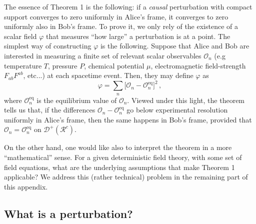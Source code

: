 \documentclass[a4paper, amsfonts, amssymb, amsmath, reprint, showkeys,  twoside, onecolumn,notitlepage,nofootinbib]{revtex4-1}
\theoremstyle{definition}
\theoremstyle{theorem}
\begin{document}
The essence of Theorem 1 is the following: if a \textit{causal} perturbation with compact support converges to zero uniformly in Alice's frame, it converges to zero uniformly also in Bob's frame. To prove it, we only rely of the existence of a scalar field $\varphi$ that measures ``how large'' a perturbation is at a point. The simplest way of constructing $\varphi$ is the following. 
Suppose that Alice and Bob are interested in measuring a finite set of relevant scalar observables $\mathcal{O}_n$ (e.g temperature $T$, pressure $P$, chemical potential $\mu$, electromagnetic field-strength $F_{ab}F^{ab}$, etc...) at each spacetime event. Then, they may define $\varphi$ as
\begin{equation}
\varphi = \sum_n \big[ \mathcal{O}_n - \mathcal{O}_n^{\text{eq}}  \big]^2 \, ,
\end{equation}
where $\mathcal{O}_n^{\text{eq}}$ is the equilibrium value of $\mathcal{O}_n$. Viewed under this light, the theorem tells us that, if the differences $\mathcal{O}_n - \mathcal{O}_n^{\text{eq}}$ go below experimental resolution uniformly in Alice's frame, then the same happens in Bob's frame, provided that $\mathcal{O}_n = \mathcal{O}_n^{\text{eq}}$ on $\mathcal{D}^+(\mathcal{R}^c)$. 

On the other hand, one would like also to interpret the theorem in a more ``mathematical'' sense. For a given deterministic field theory, with some set of field equations, what are the underlying assumptions that make Theorem 1 applicable? We address this (rather technical) problem in the remaining part of this appendix. 

\subsection{What is a perturbation?}\label{techno}
\end{document}
